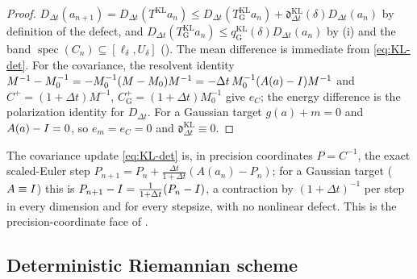 \begin{proof}
$D_{\Delta t}(a_{n+1})=D_{\Delta t}(T^{\mathrm{KL}}a_n)\leq D_{\Delta t}(T_{\mathrm G}^{\mathrm{KL}}a_n)+\mathfrak d_{\Delta t}^{\mathrm{KL}}(\delta)D_{\Delta t}(a_n)$
by definition of the defect, and $D_{\Delta t}(T_{\mathrm G}^{\mathrm{KL}}a_n)\leq q_{\mathrm G}^{\mathrm{KL}}(\delta)D_{\Delta t}(a_n)$
by (i) and the band $\operatorname{spec}(C_n)\subseteq[\ell_\delta,U_\delta]$
(). The mean difference is immediate from \eqref{eq:KL-det}. For the
covariance, the resolvent identity $M^{-1}-M_0^{-1}=-M_0^{-1}(M-M_0)M^{-1}=-\Delta t\,M_0^{-1}(A(a)-I)M^{-1}$
and $C^+=(1+\Delta t)M^{-1}$, $C_{\mathrm G}^+=(1+\Delta t)M_0^{-1}$ give $e_C$; the energy
difference is the polarization identity for $D_{\Delta t}$. For a Gaussian target
$g(a)+m=0$ and $A(a)-I=0$, so $e_m=e_C=0$ and $\mathfrak d_{\Delta t}^{\mathrm{KL}}\equiv0$.
\end{proof}

\begin{remark}
\label{rem:precision}
The covariance update \eqref{eq:KL-det} is, in precision coordinates $P=C^{-1}$, the exact
scaled-Euler step $P_{n+1}=P_n+\tfrac{\Delta t}{1+\Delta t}(A(a_n)-P_n)$; for a Gaussian
target ($A\equiv I$) this is $P_{n+1}-I=\tfrac1{1+\Delta t}(P_n-I)$, a contraction by
$(1+\Delta t)^{-1}$ per step in every dimension and for every stepsize, with no nonlinear
defect. This is the precision-coordinate face of .
\end{remark}

\subsection{Deterministic Riemannian scheme}
\label{subsec:riem-local}

